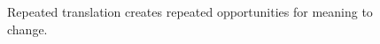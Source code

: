 \begin{figure}[H]
\centering
{}
\caption{Repeated translation creates repeated opportunities for meaning to change.}\label{fig:teach-P-01-problem-05}
\end{figure}
